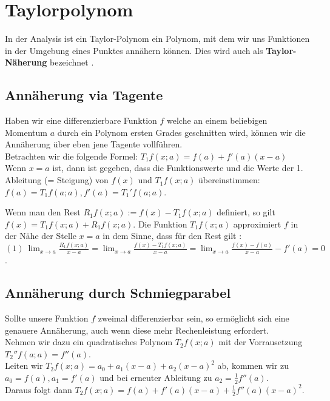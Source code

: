 
\chapter{Taylorpolynom}
\label{chapter-taylor}

In der Analysis ist ein Taylor-Polynom ein Polynom, mit dem wir uns Funktionen in der Umgebung eines Punktes annähern können. Dies wird auch als \textbf{Taylor-Näherung} bezeichnet \cite{wiki:taylor}.


\section{Annäherung via Tagente}

Haben wir eine differenzierbare Funktion $f$ welche an einem beliebigen Momentum $a$ durch ein Polynom ersten Grades geschnitten wird, können wir die Annäherung über eben jene Tagente vollführen. \\
Betrachten wir die folgende Formel: $T_1 f(x; a) = f(a) + f'(a)(x-a)$ \\
Wenn $x = a$ ist, dann ist gegeben, dass die Funktionswerte und die Werte der 1. Ableitung (= Steigung) von $f(x)$ und $T_1 f(x; a)$ übereinstimmen: $f(a) = T_1 f(a; a), f'(a) = T_1' f(a; a)$. 

Wenn man den Rest $R_1 f(x; a) := f(x) - T_1 f(x; a)$ definiert, so gilt $f(x) = T_1 f(x; a) + R_1 f(x; a)$. Die Funktion $T_1 f(x; a)$ approximiert $f$ in der Nähe der Stelle $x=a$ in dem Sinne, dass für den Rest  gilt
:$(1) ~ \lim_{x \to a} \frac{R_1 f(x; a)}{x-a} = \lim_{x \to a} \frac{f(x) - T_1 f(x; a)}{x - a}= \lim_{x \to a} \frac{f(x) - f(a)}{x - a} - f'(a) = 0$.

\section{Annäherung durch Schmiegparabel}

Sollte unsere Funktion $f$ zweimal differenzierbar sein, so ermöglicht sich eine genauere Annäherung, auch wenn diese mehr Rechenleistung erfordert. \\
Nehmen wir dazu ein quadratisches Polynom $T_2 f(x; a)$ mit der Vorrausetzung \\ $T_2'' f(a; a) = f''(a)$. \\
Leiten wir $T_2 f(x; a) = a_0 + a_1 (x-a) + a_2 (x-a)^2$ ab, kommen wir zu $a_0 = f(a), a_1 = f'(a)$ und bei erneuter Ableitung zu $a_2 = \frac{1}{2} f''(a)$. \\ 
Daraus folgt dann $T_2 f(x; a) = f(a) + f'(a)(x-a) + \frac{1}{2} f''(a)(x-a)^2$.

